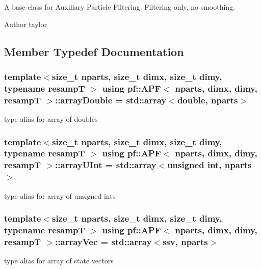 A base-\/class for Auxiliary Particle Filtering. Filtering only, no smoothing. 

\begin{DoxyAuthor}{Author}
taylor 
\end{DoxyAuthor}


\subsection{Member Typedef Documentation}
\subsubsection[{\texorpdfstring{array\+Double}{arrayDouble}}]{\setlength{\rightskip}{0pt plus 5cm}template$<$size\+\_\+t nparts, size\+\_\+t dimx, size\+\_\+t dimy, typename resampT $>$ using {\bf pf\+::\+A\+PF}$<$ nparts, dimx, dimy, resampT $>$\+::{\bf array\+Double} =  std\+::array$<$double, nparts$>$}\hypertarget{classpf_1_1APF_a4500221db97fe6af28b91fcc907bcc04}{}\label{classpf_1_1APF_a4500221db97fe6af28b91fcc907bcc04}
type alias for array of doubles 
\subsubsection[{\texorpdfstring{array\+U\+Int}{arrayUInt}}]{\setlength{\rightskip}{0pt plus 5cm}template$<$size\+\_\+t nparts, size\+\_\+t dimx, size\+\_\+t dimy, typename resampT $>$ using {\bf pf\+::\+A\+PF}$<$ nparts, dimx, dimy, resampT $>$\+::{\bf array\+U\+Int} =  std\+::array$<$unsigned int, nparts$>$}\hypertarget{classpf_1_1APF_aca139948a9e7b0432afdcae7d2ffba01}{}\label{classpf_1_1APF_aca139948a9e7b0432afdcae7d2ffba01}
type alias for array of unsigned ints 
\subsubsection[{\texorpdfstring{array\+Vec}{arrayVec}}]{\setlength{\rightskip}{0pt plus 5cm}template$<$size\+\_\+t nparts, size\+\_\+t dimx, size\+\_\+t dimy, typename resampT $>$ using {\bf pf\+::\+A\+PF}$<$ nparts, dimx, dimy, resampT $>$\+::{\bf array\+Vec} =  std\+::array$<${\bf ssv}, nparts$>$}\hypertarget{classpf_1_1APF_a62d28b3fa148d8f3fba03e4a1fb92b81}{}\label{classpf_1_1APF_a62d28b3fa148d8f3fba03e4a1fb92b81}
type alias for array of state vectors 
